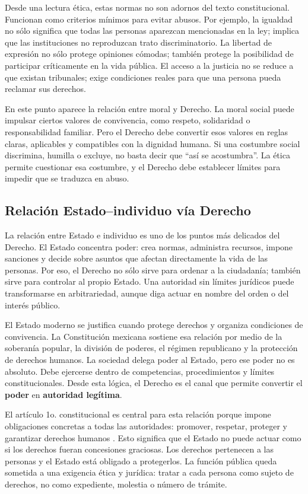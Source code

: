 \documentclass[
	spanish,
	letterpaper, oneside
]{article}
\begin{document}
Desde una lectura ética, estas normas no son adornos del texto constitucional. Funcionan como criterios mínimos para evitar abusos. Por ejemplo, la igualdad no sólo significa que todas las personas aparezcan mencionadas en la ley; implica que las instituciones no reproduzcan trato discriminatorio. La libertad de expresión no sólo protege opiniones cómodas; también protege la posibilidad de participar críticamente en la vida pública. El acceso a la justicia no se reduce a que existan tribunales; exige condiciones reales para que una persona pueda reclamar sus derechos.

En este punto aparece la relación entre moral y Derecho. La moral social puede impulsar ciertos valores de convivencia, como respeto, solidaridad o responsabilidad familiar. Pero el Derecho debe convertir esos valores en reglas claras, aplicables y compatibles con la dignidad humana. Si una costumbre social discrimina, humilla o excluye, no basta decir que ``así se acostumbra''. La ética permite cuestionar esa costumbre, y el Derecho debe establecer límites para impedir que se traduzca en abuso.

\subsection{Relación Estado--individuo vía Derecho}

La relación entre Estado e individuo es uno de los puntos más delicados del Derecho. El Estado concentra poder: crea normas, administra recursos, impone sanciones y decide sobre asuntos que afectan directamente la vida de las personas. Por eso, el Derecho no sólo sirve para ordenar a la ciudadanía; también sirve para controlar al propio Estado. Una autoridad sin límites jurídicos puede transformarse en arbitrariedad, aunque diga actuar en nombre del orden o del interés público.

El Estado moderno se justifica cuando protege derechos y organiza condiciones de convivencia. La Constitución mexicana sostiene esa relación por medio de la soberanía popular, la división de poderes, el régimen republicano y la protección de derechos humanos. La sociedad delega poder al Estado, pero ese poder no es absoluto. Debe ejercerse dentro de competencias, procedimientos y límites constitucionales. Desde esta lógica, el Derecho es el canal que permite convertir el \textbf{poder} en \textbf{autoridad legítima}.

El artículo 1o. constitucional es central para esta relación porque impone obligaciones concretas a todas las autoridades: promover, respetar, proteger y garantizar derechos humanos \citep{constitucionCPEUM2026}. Esto significa que el Estado no puede actuar como si los derechos fueran concesiones graciosas. Los derechos pertenecen a las personas y el Estado está obligado a protegerlos. La función pública queda sometida a una exigencia ética y jurídica: tratar a cada persona como sujeto de derechos, no como expediente, molestia o número de trámite.
\end{document}
